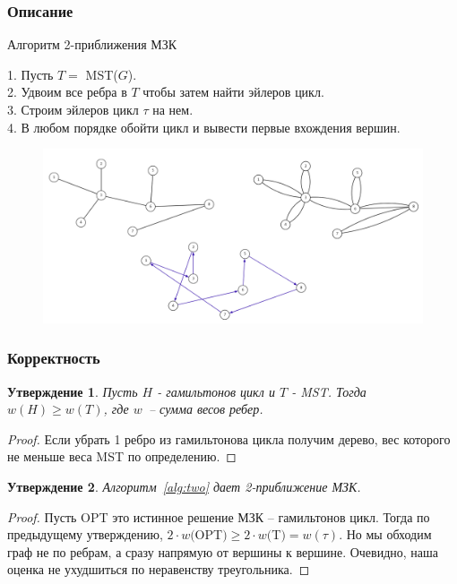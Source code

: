 \documentclass[a4paper,12pt]{article}
\renewcommand{\geq}{\ensuremath{\geqslant}}
\theoremstyle{plain}
\newtheorem{proposition}{Утверждение}[section]
\theoremstyle{definition}
\theoremstyle{remark}
\begin{document}
\subsubsection{Описание}
\begin{algorithm}
\caption{Алгоритм 2-приближения МЗК}\label{alg:two}
1. Пусть $T =$ \textsf{MST}($G$). \\
2. Удвоим все ребра в $T$ чтобы затем найти эйлеров цикл. \\
3. Строим эйлеров цикл $\tau$ на нем. \\
4. В любом порядке обойти цикл и вывести первые вхождения вершин.
\end{algorithm}

\begin{figure}[!h]
    \includegraphics[width=17cm]{img/pic1_algo.png}
    \centering
\end{figure}

\subsubsection{Корректность}
\begin{proposition}
    Пусть $H$ - гамильтонов цикл и $T$ - MST. Тогда $w(H) \geq w(T)$, где $w$~-- сумма весов ребер.
\end{proposition}
\begin{proof}
    Если убрать 1 ребро из гамильтонова цикла получим дерево, вес которого не меньше веса \textsf{MST} по определению.
\end{proof}

\begin{proposition}
    Алгоритм~\ref{alg:two} дает 2-приближение МЗК.
\end{proposition}

\begin{proof}
    Пусть \textsf{OPT} это истинное решение МЗК -- гамильтонов цикл. Тогда по предыдущему утверждению, $2 \cdot w($\textsf{OPT}$) \geq 2 \cdot w($\textsf{T}$) = w(\tau)$. 
    Но мы обходим граф не по ребрам, а сразу напрямую от вершины к вершине. Очевидно, наша оценка не ухудшиться по неравенству треугольника.
\end{proof}
\end{document}

